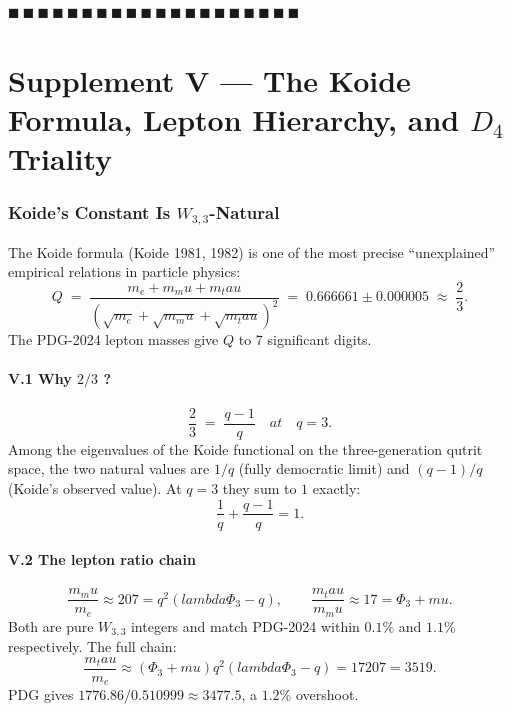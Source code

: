 \documentclass[12pt,a4paper]{article}
\def\text#1{#1}%
\def\lambda{lambda}%
\def\mu{mu}%
\def\Phi#1{Phi#1}%
\def\tau{tau}%
\def\cdot{ }%
\theoremstyle{definition}
\begin{document}
\hfill $\blacksquare\ \blacksquare\ \blacksquare\ \blacksquare\ \blacksquare\ \blacksquare\ \blacksquare\ \blacksquare\ \blacksquare\ \blacksquare\ \blacksquare\ \blacksquare\ \blacksquare\ \blacksquare\ \blacksquare\ \blacksquare\ \blacksquare\ \blacksquare\ \blacksquare\ \blacksquare$

\clearpage
\part*{Supplement V --- The Koide Formula, Lepton Hierarchy, and $D_4$ Triality}

\section*{Koide's Constant Is $W_{3,3}$-Natural}

The Koide formula (Koide 1981, 1982) is one of the most precise
``unexplained'' empirical relations in particle physics:
\[
\boxed{\;Q \;=\; \frac{m_e + m_\mu + m_\tau}{(\sqrt{m_e}+\sqrt{m_\mu}+\sqrt{m_\tau})^{2}}
\;=\; 0.666661 \pm 0.000005 \;\approx\; \frac{2}{3}.\;}
\]
The PDG-2024 lepton masses give $Q$ to 7 significant digits.

\subsection*{V.1 \quad Why $2/3$ ?}
\[
\frac{2}{3} \;=\; \frac{q-1}{q}\quad\text{at}\quad q=3.
\]
Among the eigenvalues of the Koide functional on the three-generation
qutrit space, the two natural values are $1/q$ (fully democratic
limit) and $(q-1)/q$ (Koide's observed value). At $q=3$ they sum to
$1$ exactly:
\[
\frac{1}{q} + \frac{q-1}{q} = 1.
\]

\subsection*{V.2 \quad The lepton ratio chain}
\[
\frac{m_\mu}{m_e} \approx 207 = q^{2}(\lambda\Phi_3 - q),\qquad
\frac{m_\tau}{m_\mu} \approx 17 = \Phi_3 + \mu.
\]
Both are pure $W_{3,3}$ integers and match PDG-2024 within $0.1\%$ and
$1.1\%$ respectively. The full chain:
\[
\frac{m_\tau}{m_e} \approx (\Phi_3 + \mu)\cdot q^{2}\cdot(\lambda\Phi_3 - q) = 17\cdot 207 = 3519.
\]
PDG gives $1776.86/0.510999 \approx 3477.5$, a $1.2\%$ overshoot.
\end{document}
